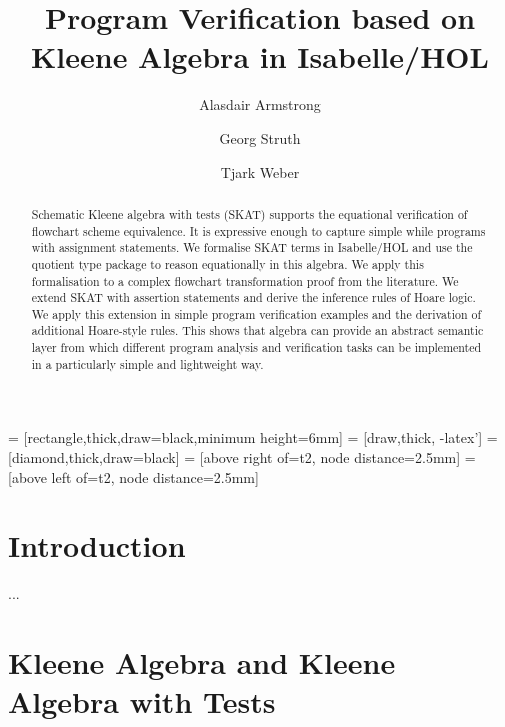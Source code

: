 \documentclass{llncs}
\begin{document}
 = [rectangle,thick,draw=black,minimum height=6mm]
 = [draw,thick, -latex']
 = [diamond,thick,draw=black]
 = [above right of=t2, node distance=2.5mm]
 = [above left of=t2, node distance=2.5mm]

\title{Program Verification based on Kleene Algebra in Isabelle/HOL}

\author{Alasdair Armstrong \and Georg Struth \and Tjark Weber}


\maketitle

\begin{abstract}
  Schematic Kleene algebra with tests (SKAT) supports the equational
  verification of flowchart scheme equivalence. It is expressive
  enough to capture simple while programs with assignment
  statements. We formalise SKAT terms in Isabelle/HOL and use the
  quotient type package to reason equationally in this algebra. We
  apply this formalisation to a complex flowchart transformation proof
  from the literature. We extend SKAT with assertion statements and
  derive the inference rules of Hoare logic. We apply this extension
  in simple program verification examples and the derivation of
  additional Hoare-style rules. This shows that algebra can provide an
  abstract semantic layer from which different program analysis and
  verification tasks can be implemented in a particularly simple and
  lightweight way.
\end{abstract}

\section{Introduction}

\newpage
...
\pagebreak

\section{Kleene Algebra and Kleene Algebra with Tests}
\label{sec:alg}
\end{document}
